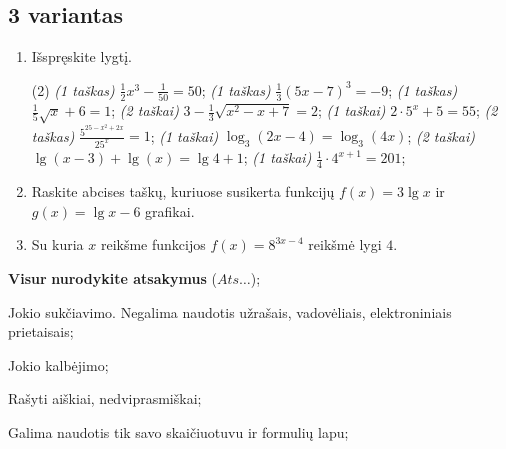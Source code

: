 \documentclass[a4paper]{article}
\begin{document}
\subsection*{3 variantas}

\begin{enumerate}
      \item Išspręskite lygtį.
            \begin{tasks}[item-format={\normalfont}, after-item-skip=2mm](2)
                  \task \textit{(1 taškas)} $\frac{1}{2}x^3-\frac{1}{50}=50$;
                  \task \textit{(1 taškas)} $\frac{1}{3}(5x-7)^3=-9$;
                  \task \textit{(1 taškas)} $\frac{1}{5}\sqrt{x}+6=1$;
                  \task \textit{(2 taškai)} $3-\frac{1}{3}\sqrt{x^2-x+7}=2$;
                  \task \textit{(1 taškai)} $2\cdot5^x+5=55$;
                  \task \textit{(2 taškas)} $\frac{5^{25-x^2+2x}}{25^x}=1$;
                  \task \textit{(1 taškai)} $\log_3(2x-4)=\log_3(4x)$;
                  \task \textit{(2 taškai)} $\lg(x-3)+\lg(x)=\lg4+1$;
                  \task \textit{(1 taškai)} $\frac{1}{4}\cdot 4^{x+1}=201$;
            \end{tasks}

      \item Raskite abcises taškų, kuriuose susikerta funkcijų $f(x)=3\lg{x}$ ir $g(x)=\lg{x}-6$ grafikai.
      \item Su kuria $x$ reikšme funkcijos $f(x)=8^{3x-4}$ reikšmė lygi $4$.
\end{enumerate}

\begin{small}
      \begin{enumerate*}[label={(\arabic*)}]
            \item \textbf{Visur} \textbf{nurodykite atsakymus} ($Ats\ldots$);
            \item Jokio sukčiavimo. Negalima naudotis užrašais, vadovėliais,
            elektroniniais prietaisais;
            \item Jokio kalbėjimo;
            \item Rašyti aiškiai, nedviprasmiškai;
            \item Galima naudotis tik savo skaičiuotuvu ir formulių lapu;
      \end{enumerate*}
\end{small}
\end{document}
